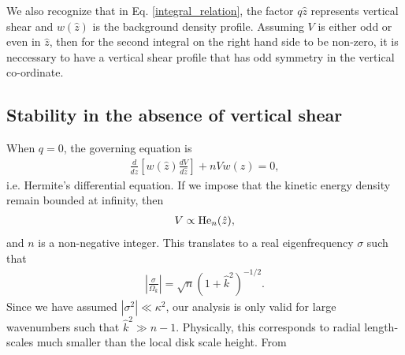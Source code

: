 We also recognize that in Eq. \ref{integral_relation}, 
the factor $q\hat{z}$ represents vertical shear and $w(\hat{z})$ is
the background density profile. Assuming $V$ is either odd or even in
$\hat{z}$,  then for the second integral on the right
hand side to be non-zero, it is neccessary to have a vertical shear
profile that has odd symmetry in the vertical co-ordinate.  

\subsection{Stability in the absence of vertical shear}
When $q=0$, the governing equation is
\begin{align}
  \frac{d}{d\hat{z}}\left[w(\hat{z})\frac{dV}{d\hat{z}}\right] + nV
  w(\hat{z}) =0, 
\end{align}
i.e. Hermite's differential equation. If we impose that the kinetic
energy density remain bounded at infinity, then  
\begin{align}
  V\propto \operatorname{He}_n(\hat{z}),
\end{align}
and $n$ is a non-negative integer. This translates to a real
eigenfrequency $\sigma$ such that
\begin{align}
  \left|\frac{\sigma}{\Omega_k}\right| = \sqrt{n}
  \left(1+\hat{k}^2\right)^{-1/2}. 
\end{align}
Since we have assumed $|\sigma^2|\ll \kappa^2$, our analysis is only
valid for large wavenumbers such that $\hat{k}^2\gg 
n-1$. Physically, this corresponds to radial length-scales much
smaller than the local disk scale height. From   

